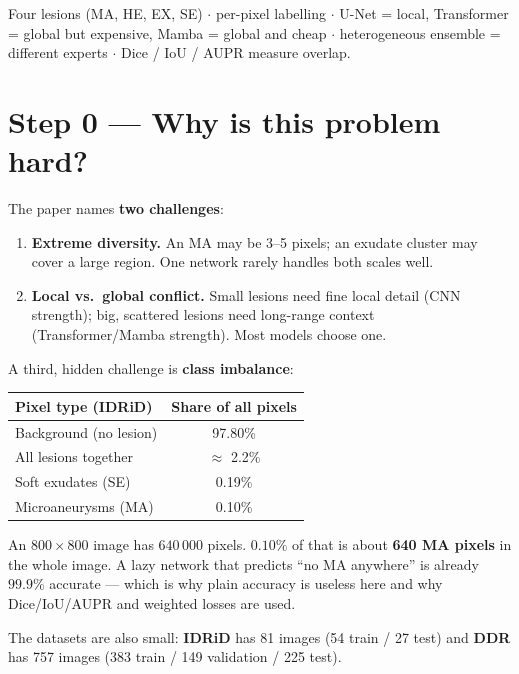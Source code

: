 \documentclass[11pt,a4paper]{article}
\begin{document}
\begin{recap}
Four lesions (MA, HE, EX, SE) $\cdot$ per-pixel labelling $\cdot$ U-Net = local, Transformer = global
but expensive, Mamba = global and cheap $\cdot$ heterogeneous ensemble = different experts $\cdot$
Dice / IoU / AUPR measure overlap.
\end{recap}

\section{Step 0 --- Why is this problem hard?}
The paper names \textbf{two challenges}:

\begin{enumerate}
\item \textbf{Extreme diversity.} An MA may be 3--5 pixels; an exudate cluster may cover a large region.
  One network rarely handles both scales well.
\item \textbf{Local vs.\ global conflict.} Small lesions need fine local detail (CNN strength); big,
  scattered lesions need long-range context (Transformer/Mamba strength). Most models choose one.
\end{enumerate}
A third, hidden challenge is \textbf{class imbalance}:
\begin{center}
\small
\begin{tabular}{@{}lc@{}}
\toprule
Pixel type (IDRiD) & Share of all pixels\\
\midrule
Background (no lesion) & 97.80\%\\
All lesions together & $\approx$ 2.2\%\\
Soft exudates (SE) & 0.19\%\\
Microaneurysms (MA) & 0.10\%\\
\bottomrule
\end{tabular}
\end{center}

\begin{worked}
An $800\times800$ image has $640\,000$ pixels. $0.10\%$ of that is about \textbf{640 MA pixels}
in the whole image. A lazy network that predicts ``no MA anywhere'' is already $99.9\%$ accurate ---
which is why plain accuracy is useless here and why Dice/IoU/AUPR and weighted losses are used.
\end{worked}

The datasets are also small: \textbf{IDRiD} has 81 images (54 train / 27 test) and \textbf{DDR} has 757
images (383 train / 149 validation / 225 test).
\end{document}
